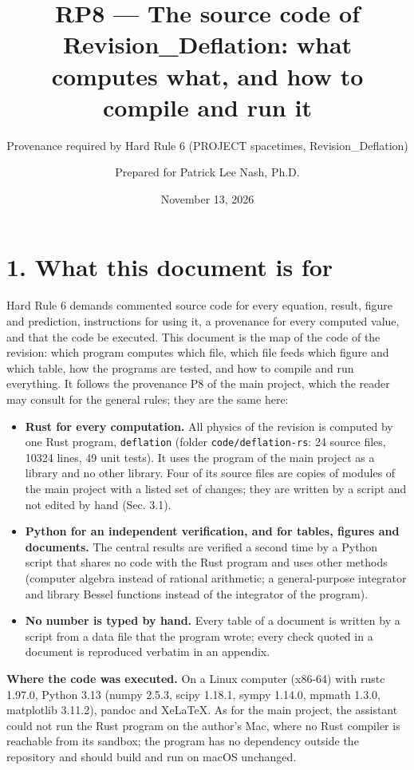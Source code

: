 \documentclass[
  10pt,
]{article}
\title{RP8 --- The source code of Revision\_Deflation: what computes
what, and how to compile and run it}
\subtitle{Provenance required by Hard Rule 6 (PROJECT spacetimes,
Revision\_Deflation)}
\author{Prepared for Patrick Lee Nash, Ph.D.}
\date{November 13, 2026}
\providecommand{\tightlist}{%
  \setlength{\itemsep}{0pt}\setlength{\parskip}{0pt}}
\begin{document}
\maketitle

\hypertarget{what-this-document-is-for}{%
\section{1. What this document is for}\label{what-this-document-is-for}}

Hard Rule 6 demands commented source code for every equation, result,
figure and prediction, instructions for using it, a provenance for every
computed value, and that the code be executed. This document is the map
of the code of the revision: which program computes which file, which
file feeds which figure and which table, how the programs are tested,
and how to compile and run everything. It follows the provenance P8 of
the main project, which the reader may consult for the general rules;
they are the same here:

\begin{itemize}
\tightlist
\item
  \textbf{Rust for every computation.} All physics of the revision is
  computed by one Rust program, \texttt{deflation} (folder
  \texttt{code/deflation-rs}: 24 source files, 10324 lines, 49 unit
  tests). It uses the program of the main project as a library and no
  other library. Four of its source files are copies of modules of the
  main project with a listed set of changes; they are written by a
  script and not edited by hand (Sec. 3.1).
\item
  \textbf{Python for an independent verification, and for tables,
  figures and documents.} The central results are verified a second time
  by a Python script that shares no code with the Rust program and uses
  other methods (computer algebra instead of rational arithmetic; a
  general-purpose integrator and library Bessel functions instead of the
  integrator of the program).
\item
  \textbf{No number is typed by hand.} Every table of a document is
  written by a script from a data file that the program wrote; every
  check quoted in a document is reproduced verbatim in an appendix.
\end{itemize}

\textbf{Where the code was executed.} On a Linux computer (x86-64) with
rustc 1.97.0, Python 3.13 (numpy 2.5.3, scipy 1.18.1, sympy 1.14.0,
mpmath 1.3.0, matplotlib 3.11.2), pandoc and XeLaTeX. As for the main
project, the assistant could not run the Rust program on the author's
Mac, where no Rust compiler is reachable from its sandbox; the program
has no dependency outside the repository and should build and run on
macOS unchanged.
\end{document}
